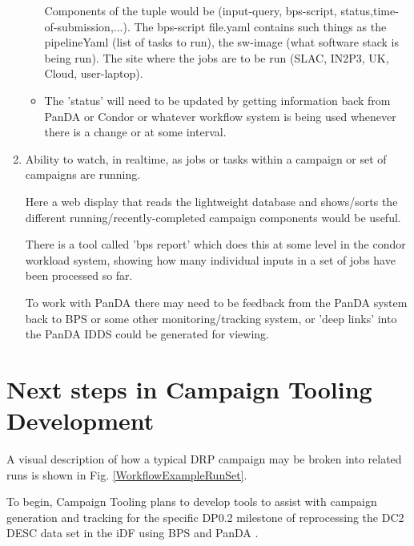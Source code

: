 \documentclass[DM,authoryear,toc]{lsstdoc}
\begin{document}
\begin{enumerate}
\begin{itemize}
	Components of the tuple would be (input-query, bps-script,
	status,time-of-submission,...). The bps-script file.yaml contains
	such things as the pipelineYaml (list of tasks to run), 
	the sw-image (what software stack is being run).
	The site where the jobs are to be run 
	(SLAC, IN2P3, UK, Cloud, user-laptop).

	\item The 'status' will need to be updated by getting information back
	from PanDA or Condor or whatever workflow system is being used whenever
	there is a change or at some interval.

	\end{itemize}

	\item Ability to watch, in realtime, as jobs or tasks within
	a campaign or set of campaigns are running.  

	Here a web display that reads the lightweight database and
	shows/sorts the different running/recently-completed campaign 
	components would be useful.

	There is a tool	
	called 'bps report' which does this at some level in the condor
	workload system, showing how many individual inputs in a set of
	jobs have been processed so far.

	To work with PanDA there may need to be feedback from the PanDA
	system back to BPS or some other monitoring/tracking system,
	or 'deep links' into the PanDA IDDS could be generated for 
	viewing.

\end{enumerate}

\section{Next steps in Campaign Tooling Development}

A visual description of how a typical DRP campaign may be broken into
related runs is shown in Fig. \ref{WorkflowExampleRunSet}.


\label{WorkflowExampleRunSet}


To begin, Campaign Tooling plans to develop tools to assist with
campaign generation and tracking for the specific DP0.2 milestone 
of reprocessing the DC2 DESC data set in the iDF using BPS
and PanDA \cite{RTN-013}.  
\end{document}
